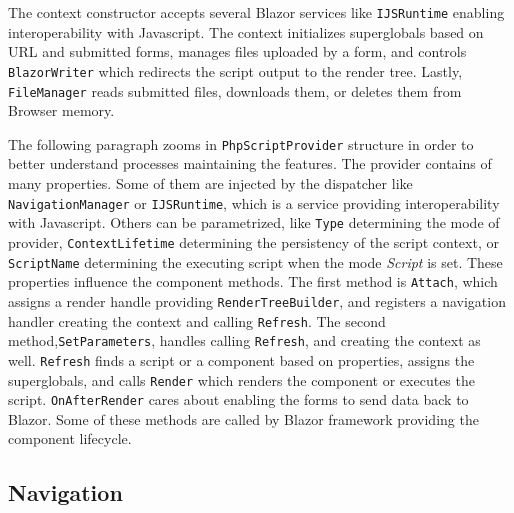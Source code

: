 The context constructor accepts several Blazor services like \texttt{IJSRuntime} enabling interoperability with Javascript.
The context initializes superglobals based on URL and submitted forms, manages files uploaded by a form, and controls  \texttt{BlazorWriter} which redirects the script output to the render tree.
Lastly, \texttt{FileManager} reads submitted files, downloads them, or deletes them from Browser memory.
\par
The following paragraph zooms in \texttt{PhpScriptProvider} structure in order to better understand processes maintaining the features.
The provider contains of many properties.
Some of them are injected by the dispatcher like \texttt{NavigationManager} or \texttt{IJSRuntime}, which is a service providing interoperability with Javascript.
Others can be parametrized, like \texttt{Type} determining the mode of provider, \texttt{ContextLifetime} determining the persistency of the script context, or \texttt{ScriptName} determining the executing script when the mode \textit{Script} is set.
These properties influence the component methods.
The first method is \texttt{Attach}, which assigns a render handle providing \texttt{RenderTreeBuilder}, and registers a navigation handler creating the context and calling \texttt{Refresh}.
The second method,\texttt{SetParameters}, handles calling \texttt{Refresh}, and creating the context as well.
\texttt{Refresh} finds a script or a component based on properties, assigns the superglobals, and calls \texttt{Render} which renders the component or executes the script.
\texttt{OnAfterRender} cares about enabling the forms to send data back to Blazor.
Some of these methods are called by Blazor framework providing the component lifecycle.

\subsection{Navigation}

